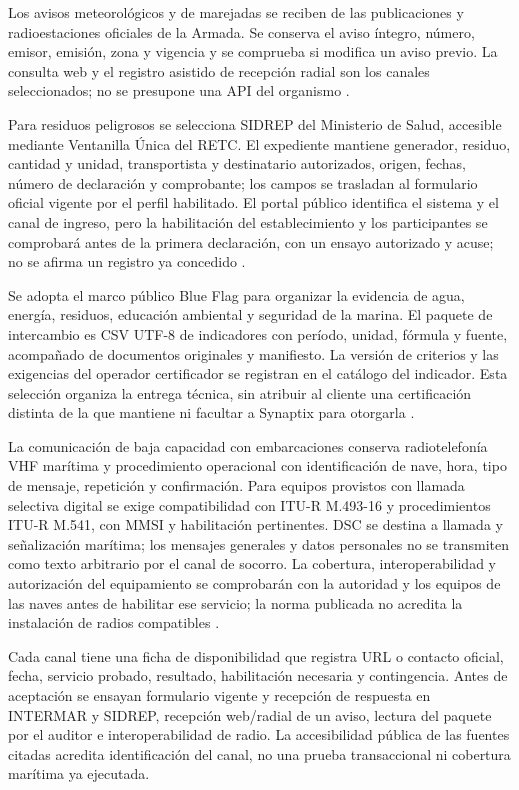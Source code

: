 Los avisos meteorológicos y de marejadas se reciben de las publicaciones y radioestaciones oficiales de la Armada. Se conserva el aviso íntegro, número, emisor, emisión, zona y vigencia y se comprueba si modifica un aviso previo. La consulta web y el registro asistido de recepción radial son los canales seleccionados; no se presupone una API del organismo \parencite{armada-marejadas}.

Para residuos peligrosos se selecciona SIDREP del Ministerio de Salud, accesible mediante Ventanilla Única del RETC. El expediente mantiene generador, residuo, cantidad y unidad, transportista y destinatario autorizados, origen, fechas, número de declaración y comprobante; los campos se trasladan al formulario oficial vigente por el perfil habilitado. El portal público identifica el sistema y el canal de ingreso, pero la habilitación del establecimiento y los participantes se comprobará antes de la primera declaración, con un ensayo autorizado y acuse; no se afirma un registro ya concedido \parencite{mma-sidrep}.

Se adopta el marco público Blue Flag para organizar la evidencia de agua, energía, residuos, educación ambiental y seguridad de la marina. El paquete de intercambio es CSV UTF-8 de indicadores con período, unidad, fórmula y fuente, acompañado de documentos originales y manifiesto. La versión de criterios y las exigencias del operador certificador se registran en el catálogo del indicador. Esta selección organiza la entrega técnica, sin atribuir al cliente una certificación distinta de la que mantiene ni facultar a Synaptix para otorgarla \parencite{blueflag-criteria}.

La comunicación de baja capacidad con embarcaciones conserva radiotelefonía VHF marítima y procedimiento operacional con identificación de nave, hora, tipo de mensaje, repetición y confirmación. Para equipos provistos con llamada selectiva digital se exige compatibilidad con ITU-R M.493-16 y procedimientos ITU-R M.541, con MMSI y habilitación pertinentes. DSC se destina a llamada y señalización marítima; los mensajes generales y datos personales no se transmiten como texto arbitrario por el canal de socorro. La cobertura, interoperabilidad y autorización del equipamiento se comprobarán con la autoridad y los equipos de las naves antes de habilitar ese servicio; la norma publicada no acredita la instalación de radios compatibles \parencite{itu-m493}.

Cada canal tiene una ficha de disponibilidad que registra URL o contacto oficial, fecha, servicio probado, resultado, habilitación necesaria y contingencia. Antes de aceptación se ensayan formulario vigente y recepción de respuesta en INTERMAR y SIDREP, recepción web/radial de un aviso, lectura del paquete por el auditor e interoperabilidad de radio. La accesibilidad pública de las fuentes citadas acredita identificación del canal, no una prueba transaccional ni cobertura marítima ya ejecutada.

